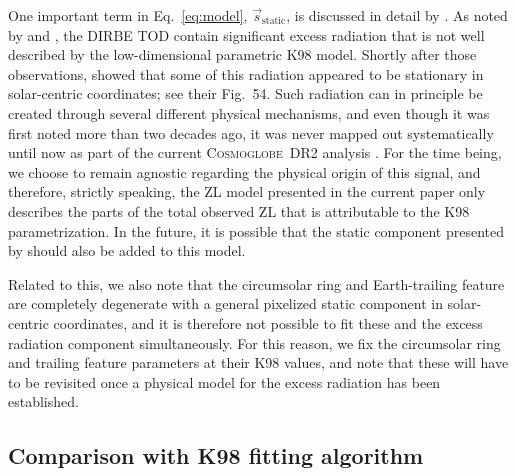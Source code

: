 \documentclass[twocolumn]{aa}
\def\Planck{\textit{Planck}}
\def\IRAS{\textit{IRAS}}
\def\AKARI{\textit{AKARI}}
\newcommand{\s}[0]{\vec{s}}
\newcommand{\cosmoglobe}{\textsc{Cosmoglobe}}
\begin{document}
One important term in
Eq.~\eqref{eq:model}, $\s_{\mathrm{static}}$, is
discussed in detail by \citet{CG02_01}.  As noted by
\citet{hauser1998} and \citet{kelsall1998}, the DIRBE TOD contain
significant excess radiation that is not well described by the
low-dimensional parametric K98 model. Shortly after those
observations, \citet{leinert:1998} showed that some of this radiation
appeared to be stationary in solar-centric coordinates; see their
Fig.~54. Such radiation can in principle be created through several
different physical mechanisms, and 
even though it was first noted more than two decades ago, it was never mapped out
systematically until now as part of the current \cosmoglobe\ DR2
analysis \citep{CG02_01}. For the time being, we choose to remain
agnostic regarding the physical origin of this signal, and therefore,
strictly speaking, the ZL model presented in the current paper only
describes the parts of the total observed ZL that is attributable to
the K98 parametrization. In the future, it is possible that the static
component presented by \citet{CG02_01} should also be added to this
model. 

Related to this, we also note that the circumsolar ring and Earth-trailing
feature are completely degenerate
with a general pixelized static component in solar-centric
coordinates, and it is therefore not possible to fit these and the
excess radiation component simultaneously. For this reason, we fix the
circumsolar ring and trailing feature parameters at their K98 values,
and note that these will have to be revisited once a physical model
for the excess radiation has been established.

\subsection{Comparison with K98 fitting algorithm}
\label{sec:algorithm_comparison}
\end{document}
